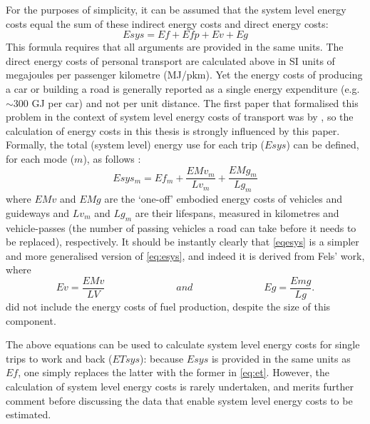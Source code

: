 For the purposes of simplicity, it can be assumed that the system level energy
costs equal the sum of these indirect energy costs and direct energy costs:
\begin{equation}
 Esys = Ef + Efp + Ev + Eg
 \label{eqesys}
\end{equation}
This formula requires that all arguments are provided in the same units.
The direct energy costs of personal transport are calculated above in SI
units of megajoules per passenger kilometre (MJ/pkm). Yet the energy costs of
producing a car or building a road is generally reported as a single energy
expenditure (e.g.~$\sim$300 GJ per car) and not per unit distance.
The first paper that formalised this problem in the context of system level
energy costs of transport was by \citet{Fels1975}, so the calculation of
energy costs in this thesis is strongly influenced by this paper.
Formally, the total (system level) energy use for each trip ($Esys$) can be
defined, for each mode ($m$), as follows \citet{Fels1975}:
\begin{equation}
Esys_m =  Ef_m +  \frac{EMv_m}{Lv_m} + \frac{EMg_m}{Lg_m}
\label{eq:esys}
\end{equation}
where $EMv$ and $EMg$ are the `one-off' embodied energy costs of
vehicles and guideways and
$Lv_m$ and $Lg_m$ are their lifespans,
measured in kilometres and vehicle-passes (the number of passing vehicles a road
can take before it needs to be replaced), respectively.
It should be instantly clearly that \cref{eqesys} is a simpler and
more generalised version
of \cref{eq:esys}, and indeed it is derived from Fels' work, where
\begin{equation}
 Ev = \frac{EMv}{LV} \hspace{3cm} and  \hspace{3cm} Eg =
\frac{Emg}{Lg}.
\end{equation}
\citet{Fels1975} did not include the energy costs of fuel production, despite
the size of this component.

The above equations can be used to calculate
system level energy costs for single trips to work and back ($ETsys$):
because $Esys$ is provided in the same units as $Ef$, one simply replaces the
latter with the former in \cref{eq:et}. %
However, the calculation of
system level energy costs is rarely undertaken, and merits further comment
before
discussing the data that enable system level energy costs to be estimated. 

